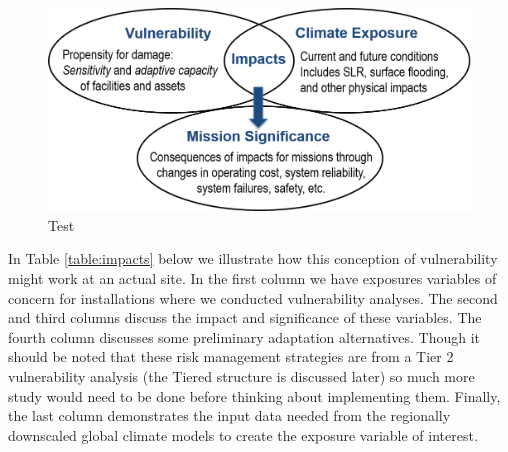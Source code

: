 \documentclass[10pt]{amsart}
\begin{document}
\begin{figure}[H]\label{fig:impacts}
\includegraphics[width=12cm]{impacts.png}
\caption{Test}
\end{figure}

In Table \ref{table:impacts} below we illustrate how this conception of vulnerability might work at an actual site.
In the first column we have exposures variables of concern for installations where we conducted vulnerability analyses.
The second and third columns discuss the impact and significance of these variables.
The fourth column discusses some preliminary adaptation alternatives.
Though it should be noted that these risk management strategies are from a Tier 2 vulnerability analysis (the Tiered structure is discussed later) so much more study would need to be done before thinking about implementing them. 
Finally, the last column demonstrates the input data needed from the regionally downscaled global climate models to create the exposure variable of interest.
\end{document}
